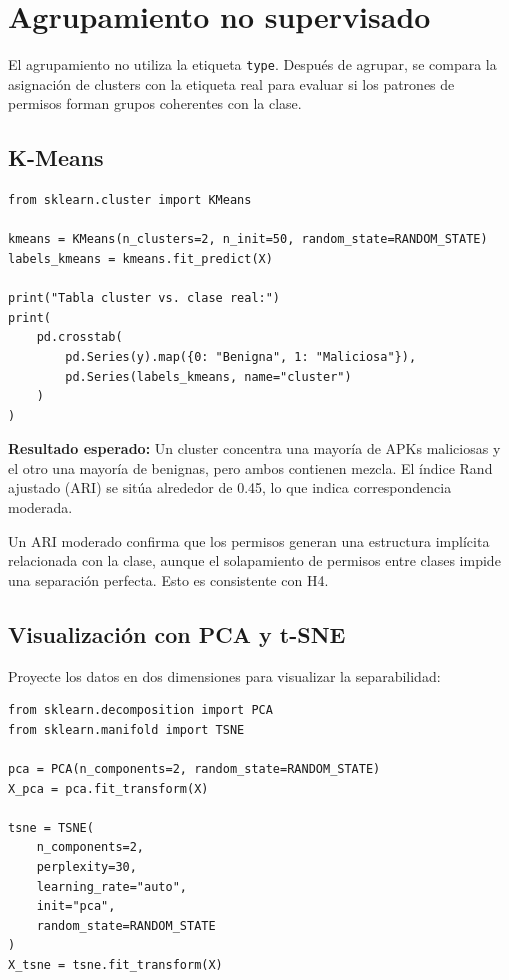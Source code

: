 \documentclass[
  coursetitle={Cómputo Nube y Tecnologías Emergentes},
  coursehours={96},
  coursedate={Verano 2026},
  doctype={Tutorial},
  otherlangs={english,french},
  authorname={Lázaro},
  authorsurname={Bustio-Martínez},
  authortitle={PhD},
  role={Profesor Investigador},
  email={lbustio@inaoe.mx},
  phone={5559504000},
  ext={7459},
  institution={Instituto Nacional de Astrofísica, Óptica y Electrónica (INAOE)},
  department={Maestría en Ciencias en Tecnologías de Seguridad},
  address={Luis Enrique Erro 1, Sta. Ma. Tonantzintla, San Andrés Cholula, CP 72840, Puebla, México},
  margin={0.5in}
]{../../lbustio_lecture_notes}
\begin{document}
\section{Agrupamiento no supervisado}

El agrupamiento no utiliza la etiqueta \texttt{type}. Después de agrupar, se compara la asignación de clusters con la etiqueta real para evaluar si los patrones de permisos forman grupos coherentes con la clase.

\subsection{K-Means}

\begin{lstlisting}
from sklearn.cluster import KMeans

kmeans = KMeans(n_clusters=2, n_init=50, random_state=RANDOM_STATE)
labels_kmeans = kmeans.fit_predict(X)

print("Tabla cluster vs. clase real:")
print(
    pd.crosstab(
        pd.Series(y).map({0: "Benigna", 1: "Maliciosa"}),
        pd.Series(labels_kmeans, name="cluster")
    )
)
\end{lstlisting}

\textbf{Resultado esperado:} Un cluster concentra una mayoría de APKs maliciosas y el otro una mayoría de benignas, pero ambos contienen mezcla. El índice Rand ajustado (ARI) se sitúa alrededor de 0.45, lo que indica correspondencia moderada.

\begin{tcolorbox}[title=Interpretación]
Un ARI moderado confirma que los permisos generan una estructura implícita relacionada con la clase, aunque el solapamiento de permisos entre clases impide una separación perfecta. Esto es consistente con H4.
\end{tcolorbox}

\subsection{Visualización con PCA y t-SNE}

Proyecte los datos en dos dimensiones para visualizar la separabilidad:

\begin{lstlisting}
from sklearn.decomposition import PCA
from sklearn.manifold import TSNE

pca = PCA(n_components=2, random_state=RANDOM_STATE)
X_pca = pca.fit_transform(X)

tsne = TSNE(
    n_components=2,
    perplexity=30,
    learning_rate="auto",
    init="pca",
    random_state=RANDOM_STATE
)
X_tsne = tsne.fit_transform(X)
\end{lstlisting}
\end{document}
